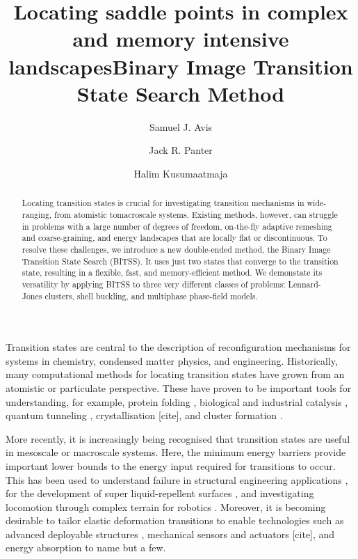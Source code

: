 \documentclass[aps,prl,twocolumn,10pt,groupedaddress]{revtex4-2}
\begin{document}
\title{Locating saddle points in complex and memory intensive landscapes}
\title{Binary Image Transition State Search Method}
\author{Samuel J. Avis}
\author{Jack R. Panter}
\author{Halim Kusumaatmaja}

\begin{abstract}
  Locating transition states is crucial for investigating transition mechanisms in wide-ranging, from atomistic tomacroscale systems.
  Existing methods, however, can struggle in problems with a large number of degrees of freedom, on-the-fly adaptive remeshing and coarse-graining, and energy landscapes that are locally flat or discontinuous.
  To resolve these challenges, we introduce a new double-ended method, the Binary Image Transition State Search (BITSS).
  It uses just two states that converge to the transition state, resulting in a flexible, fast, and memory-efficient method.
  We demonstate its versatility by applying BITSS to three very different classes of problems: Lennard-Jones clusters, shell buckling, and multiphase phase-field models.
\end{abstract}

\maketitle


Transition states are central to the description of reconfiguration mechanisms for systems in chemistry, condensed matter physics, and engineering.
Historically, many computational methods for locating transition states have grown from an atomistic or particulate perspective.
These have proven to be important tools for understanding, for example, protein folding \cite{Bryngelson1995,Onuchic1997}, biological and industrial catalysis \cite{Boehr2006,Kerns2015,Guo2018a}, quantum tunneling \cite{Richardson2016,Vaillant2019}, crystallisation [cite], and cluster formation \cite{Wales1998,Wales2012}.

More recently, it is increasingly being recognised that transition states are useful in mesoscale or macroscale systems.
Here, the minimum energy barriers provide important lower bounds to the energy input required for transitions to occur.
This has been used to understand failure in structural engineering applications \cite{Panter2019,Hutchinson2018}, for the development of super liquid-repellent surfaces \cite{Zhang2014,Panter2019b}, and investigating locomotion through complex terrain for robotics \cite{Othayoth2020}.
Moreover, it is becoming desirable to tailor elastic deformation transitions to enable technologies such as advanced deployable structures \cite{Filipov2015,Zhai2018}, mechanical sensors and actuators [cite], and energy absorption \cite{Shan2015} to name but a few.
\end{document}
